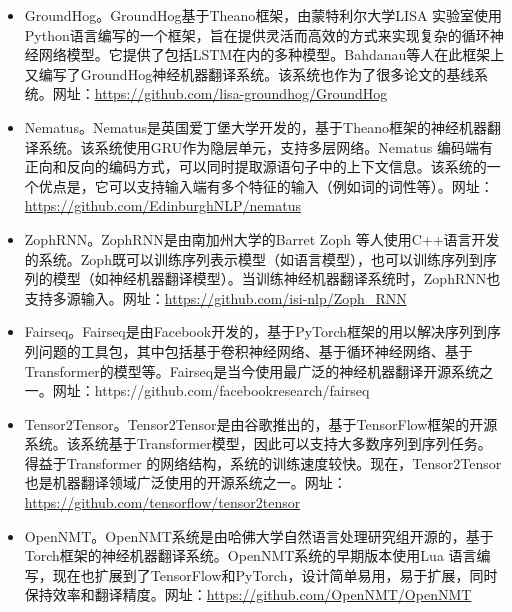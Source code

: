 \begin{itemize}
\vspace{0.5em}
\item GroundHog。GroundHog\cite{bahdanau2014neural}基于Theano\cite{al2016theano}框架，由蒙特利尔大学LISA 实验室使用Python语言编写的一个框架，旨在提供灵活而高效的方式来实现复杂的循环神经网络模型。它提供了包括LSTM在内的多种模型。Bahdanau等人在此框架上又编写了GroundHog神经机器翻译系统。该系统也作为了很多论文的基线系统。网址：\url{https://github.com/lisa-groundhog/GroundHog}
\vspace{0.5em}
\item Nematus。Nematus\cite{DBLP:journals/corr/SennrichFCBHHJL17}是英国爱丁堡大学开发的，基于Theano框架的神经机器翻译系统。该系统使用GRU作为隐层单元，支持多层网络。Nematus 编码端有正向和反向的编码方式，可以同时提取源语句子中的上下文信息。该系统的一个优点是，它可以支持输入端有多个特征的输入（例如词的词性等）。网址：\url{https://github.com/EdinburghNLP/nematus}
\vspace{0.5em}
\item ZophRNN。ZophRNN\cite{zoph2016simple}是由南加州大学的Barret Zoph 等人使用C++语言开发的系统。Zoph既可以训练序列表示模型（如语言模型），也可以训练序列到序列的模型（如神经机器翻译模型）。当训练神经机器翻译系统时，ZophRNN也支持多源输入。网址：\url{https://github.com/isi-nlp/Zoph\_RNN}
\vspace{0.5em}
\item Fairseq。Fairseq\cite{Ottfairseq}是由Facebook开发的，基于PyTorch框架的用以解决序列到序列问题的工具包，其中包括基于卷积神经网络、基于循环神经网络、基于Transformer的模型等。Fairseq是当今使用最广泛的神经机器翻译开源系统之一。网址：https://github.com/facebookresearch/fairseq
\vspace{0.5em}
\item Tensor2Tensor。Tensor2Tensor\cite{VaswaniTensor2Tensor}是由谷歌推出的，基于TensorFlow框架的开源系统。该系统基于Transformer模型，因此可以支持大多数序列到序列任务。得益于Transformer 的网络结构，系统的训练速度较快。现在，Tensor2Tensor也是机器翻译领域广泛使用的开源系统之一。网址：\url{https://github.com/tensorflow/tensor2tensor}
\vspace{0.5em}
\item OpenNMT。OpenNMT\cite{KleinOpenNMT}系统是由哈佛大学自然语言处理研究组开源的，基于Torch框架的神经机器翻译系统。OpenNMT系统的早期版本使用Lua 语言编写，现在也扩展到了TensorFlow和PyTorch，设计简单易用，易于扩展，同时保持效率和翻译精度。网址：\url{https://github.com/OpenNMT/OpenNMT}
\vspace{0.5em}

\end{itemize}
